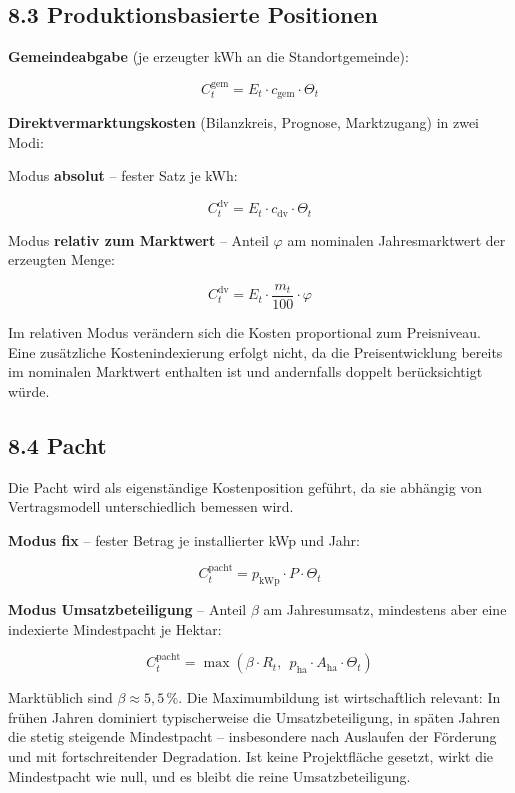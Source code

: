 \documentclass[
  a4paper,
  10pt]{article}
\begin{document}
\hypertarget{produktionsbasierte-positionen}{%
\subsection{8.3 Produktionsbasierte
Positionen}\label{produktionsbasierte-positionen}}

\textbf{Gemeindeabgabe} (je erzeugter kWh an die Standortgemeinde):

\[ C^{\mathrm{gem}}_t = E_t \cdot c_{\mathrm{gem}} \cdot \Theta_t \]

\textbf{Direktvermarktungskosten} (Bilanzkreis, Prognose, Marktzugang)
in zwei Modi:

Modus \textbf{absolut} -- fester Satz je kWh:

\[ C^{\mathrm{dv}}_t = E_t \cdot c_{\mathrm{dv}} \cdot \Theta_t \]

Modus \textbf{relativ zum Marktwert} -- Anteil \(\varphi\) am nominalen
Jahresmarktwert der erzeugten Menge:

\[ C^{\mathrm{dv}}_t = E_t \cdot \frac{m_t}{100} \cdot \varphi \]

Im relativen Modus verändern sich die Kosten proportional zum
Preisniveau. Eine zusätzliche Kostenindexierung erfolgt nicht, da die
Preisentwicklung bereits im nominalen Marktwert enthalten ist und
andernfalls doppelt berücksichtigt würde.

\hypertarget{pacht}{%
\subsection{8.4 Pacht}\label{pacht}}

Die Pacht wird als eigenständige Kostenposition geführt, da sie abhängig
von Vertragsmodell unterschiedlich bemessen wird.

\textbf{Modus fix} -- fester Betrag je installierter kWp und Jahr:

\[ C^{\mathrm{pacht}}_t = p_{\mathrm{kWp}} \cdot P \cdot \Theta_t \]

\textbf{Modus Umsatzbeteiligung} -- Anteil \(\beta\) am Jahresumsatz,
mindestens aber eine indexierte Mindestpacht je Hektar:

\[ C^{\mathrm{pacht}}_t = \max\left(\beta \cdot R_t,\ \ p_{\mathrm{ha}} \cdot A_{\mathrm{ha}} \cdot \Theta_t\right) \]

Marktüblich sind \(\beta \approx 5{,}5\,\%\). Die Maximumbildung ist
wirtschaftlich relevant: In frühen Jahren dominiert typischerweise die
Umsatzbeteiligung, in späten Jahren die stetig steigende Mindestpacht --
insbesondere nach Auslaufen der Förderung und mit fortschreitender
Degradation. Ist keine Projektfläche gesetzt, wirkt die Mindestpacht wie
null, und es bleibt die reine Umsatzbeteiligung.
\end{document}
